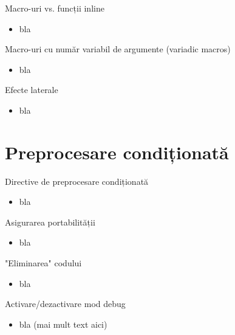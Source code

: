 \documentclass{beamer}
\begin{document}
\begin{frame}{Macro-uri vs. funcții inline}
  \begin{itemize}
    \item bla
  \end{itemize}
\end{frame}

\begin{frame}{Macro-uri cu număr variabil de argumente (variadic macros)}
  \begin{itemize}
    \item bla
  \end{itemize}
\end{frame}

\begin{frame}{Efecte laterale}
  \begin{itemize}
    \item bla
  \end{itemize}
\end{frame}

\section{Preprocesare condiționată}

\frame{\tableofcontents[currentsection]}

\begin{frame}{Directive de preprocesare condiționată}
  \begin{itemize}
    \item bla
  \end{itemize}
\end{frame}

\begin{frame}{Asigurarea portabilității}
  \begin{itemize}
    \item bla
  \end{itemize}
\end{frame}

\begin{frame}{"Eliminarea" codului}
  \begin{itemize}
    \item bla
  \end{itemize}
\end{frame}

\begin{frame}{Activare/dezactivare mod debug}
  \begin{itemize}
    \item bla (mai mult text aici)
  \end{itemize}
\end{frame}
\end{document}
